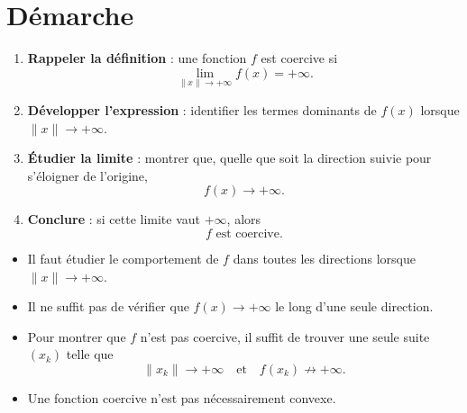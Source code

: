 
\section{Démarche}

\begin{methode}
\begin{enumerate}[label=\textbf{Étape \arabic*.}]
    \item \textbf{Rappeler la définition} : une fonction $f$ est coercive si
    \[
    \lim_{\|x\|\to+\infty}f(x)=+\infty.
    \]

    \item \textbf{Développer l'expression} : identifier les termes dominants de $f(x)$ lorsque $\|x\|\to+\infty$.

    \item \textbf{Étudier la limite} : montrer que, quelle que soit la direction suivie pour s'éloigner de l'origine,
    \[
    f(x)\longrightarrow+\infty.
    \]

    \item \textbf{Conclure} : si cette limite vaut $+\infty$, alors
    \[
    \boxed{f\text{ est coercive}.}
    \]
\end{enumerate}
\end{methode}

\begin{attention}
\begin{itemize}
    \item Il faut étudier le comportement de $f$ dans toutes les directions lorsque $\|x\|\to+\infty$.
    \item Il ne suffit pas de vérifier que $f(x)\to+\infty$ le long d'une seule direction.
    \item Pour montrer que $f$ n'est pas coercive, il suffit de trouver une seule suite $(x_k)$ telle que
    \[
    \|x_k\|\to+\infty
    \quad\text{et}\quad
    f(x_k)\not\to+\infty.
    \]
    \item Une fonction coercive n'est pas nécessairement convexe.
\end{itemize}
\end{attention}

